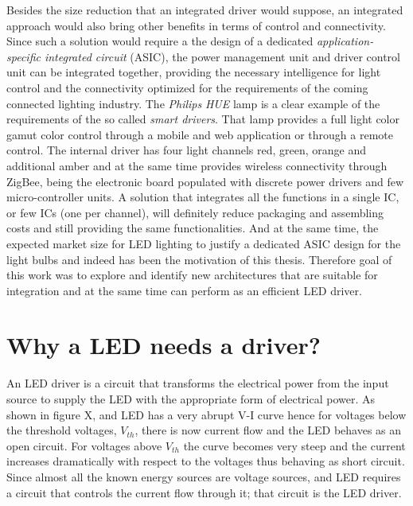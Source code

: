 Besides the size reduction that an integrated driver would suppose, an integrated approach would also bring other benefits in terms of control and connectivity. Since such a solution would require a the design of a dedicated \emph{application-specific integrated circuit} (ASIC), the power management unit and driver control unit can be integrated together, providing the necessary intelligence for light control and the connectivity optimized for the requirements of the coming connected lighting industry. The \emph{Philips} \emph{HUE} lamp is a clear example of the requirements of the so called \emph{smart drivers}. That lamp provides a full light color gamut color control through a mobile and web application or through a remote control. The internal driver has four light channels red, green, orange and additional amber and at the same time provides wireless connectivity through ZigBee, being the electronic board populated with discrete power drivers and few micro-controller units. A solution that integrates all the functions in a single IC, or few ICs (one per channel), will definitely reduce packaging and assembling costs and still providing the same functionalities. And at the same time, the expected market size for LED lighting to justify a dedicated ASIC design for the light bulbs and indeed has been the motivation of this thesis. Therefore goal of this work was to explore and identify new architectures that are suitable for integration and at the same time can perform as an efficient LED driver.


\chapter{Why a LED needs a driver?}

An LED driver is a circuit that transforms the electrical power from the input source to supply the LED with the appropriate form of electrical power.  As shown in figure X, and LED has a very abrupt V-I curve hence for voltages below the threshold voltages, $V_{th}$, there is now current flow and the LED behaves as an open circuit. For voltages above $V_{th}$ the curve becomes very steep and the current increases dramatically with respect to the voltages thus behaving as short circuit. Since almost all the known energy sources are voltage sources, and LED requires a circuit that controls the current flow through it; that circuit is the LED driver. 

